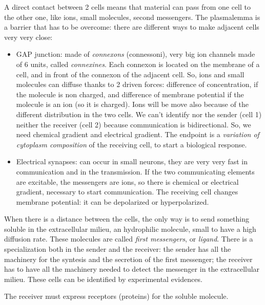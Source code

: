 \documentclass[a4paper, 12pt]{book}
\begin{document}
A direct contact between 2 cells means that material can pass from one cell to the other one, like ions, small molecules, second messengers. The plasmalemma is a barrier that has to be overcome: there are different ways to make adjacent cells very very close:
\begin{itemize}
\item{GAP junction: made of \emph{connexons} (connessoni), very big ion channels made of 6 units, called \emph{connexines}. Each connexon is located on the membrane of a cell, and in front of the connexon of the adjacent cell. So, ions and small molecules can diffuse thanks to 2 driven forces: difference of concentration, if the molecule is non charged, and  difference of membrane potential if the molecule is an ion (so it is charged). Ions will be move also because of the different distribution in the two cells. We can't identify nor the sender (cell 1) neither the receiver (cell 2) because communication is bidirectional. So, we need chemical gradient and electrical gradient. The endpoint is a \emph{variation of cytoplasm composition} of the receiving cell, to start a biological response.}
\item{Electrical synapses: can occur in small neurons, they are very very fast in communication and in the transmission. If the two communicating elements are excitable, the messengers are ions, so there is chemical or electrical gradient, necessary to start communication. The receiving cell changes membrane potential: it can be depolarized or hyperpolarized. }
\end{itemize}

When there is a distance between the cells, the only way is to send something soluble in the extracellular milieu, an hydrophilic molecule, small to have a high diffusion rate. These molecules are called \emph{first messengers}, or \emph{ligand}. There is a specialization both in the sender and the receiver: the sender has all the machinery for the syntesis and the secretion of the first messenger; the receiver has to have all the machinery needed to detect the messenger in the extracellular milieu. These cells can be identified by experimental evidences.

The receiver must express receptors (proteins) for the soluble molecule.
\end{document}
